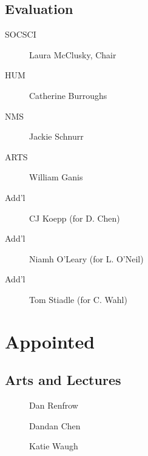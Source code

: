 \documentclass[10pt, twocolumn]{amsart}
\begin{document}
\subsection*{Evaluation}
\begin{description}
\item[SOCSCI] Laura McClusky, Chair
\item[HUM] Catherine Burroughs 
\item[NMS] Jackie Schnurr
\item[ARTS] William Ganis
\item[Add'l] CJ Koepp (for D. Chen)
\item[Add'l] Niamh O'Leary (for L. O'Neil)
\item[Add'l] Tom Stiadle (for C. Wahl)
\end{description}

%

\section*{Appointed}
\subsection*{Arts and Lectures}
\begin{description}
\item[] Dan Renfrow
\item[] Dandan Chen
\item[] Katie Waugh
\end{description}
\end{document}
